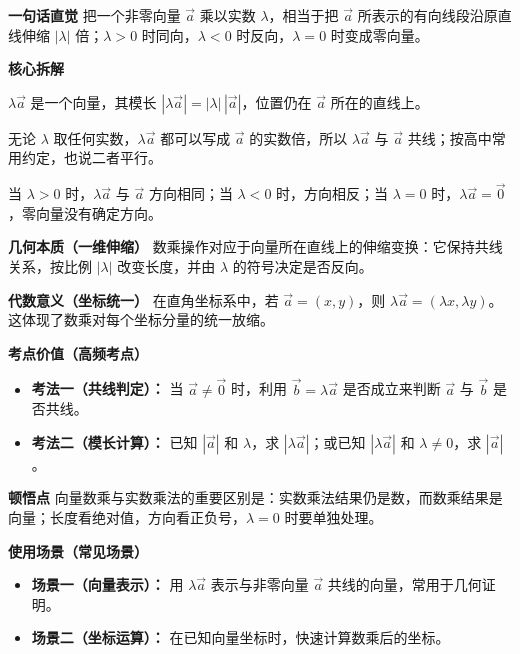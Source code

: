 \begin{explanationbox}
	\textbf{\textcolor{CExplanation}{一句话直觉}}
	把一个非零向量 $\vec{a}$ 乘以实数 $\lambda$，相当于把 $\vec{a}$ 所表示的有向线段沿原直线伸缩 $|\lambda|$ 倍；$\lambda>0$ 时同向，$\lambda<0$ 时反向，$\lambda=0$ 时变成零向量。

	\medskip
	\textbf{\textcolor{CExplanation}{核心拆解}}
	\begin{description}[style=nextline, leftmargin=2.8em, labelsep=0.5em, itemsep=0.45em]
		\item[\textbf{要点一（数乘定义）：}]
			$\lambda\vec{a}$ 是一个向量，其模长 $|\lambda\vec{a}| = |\lambda|\,|\vec{a}|$，位置仍在 $\vec{a}$ 所在的直线上。
		\item[\textbf{要点二（共线恒成立）：}]
			无论 $\lambda$ 取任何实数，$\lambda\vec{a}$ 都可以写成 $\vec{a}$ 的实数倍，所以 $\lambda\vec{a}$ 与 $\vec{a}$ 共线；按高中常用约定，也说二者平行。
		\item[\textbf{要点三（符号判方向）：}]
			当 $\lambda > 0$ 时，$\lambda\vec{a}$ 与 $\vec{a}$ 方向相同；当 $\lambda < 0$ 时，方向相反；当 $\lambda=0$ 时，$\lambda\vec{a}=\vec{0}$，零向量没有确定方向。
	\end{description}

	\medskip
	\textbf{\textcolor{CExplanation}{几何本质（一维伸缩）}}
	数乘操作对应于向量所在直线上的伸缩变换：它保持共线关系，按比例 $|\lambda|$ 改变长度，并由 $\lambda$ 的符号决定是否反向。

	\medskip
	\textbf{\textcolor{CExplanation}{代数意义（坐标统一）}}
	在直角坐标系中，若 $\vec{a}=(x,y)$，则 $\lambda\vec{a}=(\lambda x,\lambda y)$。这体现了数乘对每个坐标分量的统一放缩。

	\medskip
	\textbf{\textcolor{CExplanation}{考点价值（高频考点）}}
	\begin{itemize}[leftmargin=*, itemsep=0.5em, topsep=0.4em]
		\item \textbf{考法一（共线判定）：} 当 $\vec{a}\neq\vec{0}$ 时，利用 $\vec{b}=\lambda\vec{a}$ 是否成立来判断 $\vec{a}$ 与 $\vec{b}$ 是否共线。
		\item \textbf{考法二（模长计算）：} 已知 $|\vec{a}|$ 和 $\lambda$，求 $|\lambda\vec{a}|$；或已知 $|\lambda\vec{a}|$ 和 $\lambda\neq0$，求 $|\vec{a}|$。
	\end{itemize}

	\medskip
	\textbf{\textcolor{CExplanation}{顿悟点}}
	向量数乘与实数乘法的重要区别是：实数乘法结果仍是数，而数乘结果是向量；长度看绝对值，方向看正负号，$\lambda=0$ 时要单独处理。

	\medskip
	\textbf{\textcolor{CExplanation}{使用场景（常见场景）}}
	\begin{itemize}[leftmargin=*, itemsep=0.5em, topsep=0.4em]
		\item \textbf{场景一（向量表示）：} 用 $\lambda\vec{a}$ 表示与非零向量 $\vec{a}$ 共线的向量，常用于几何证明。
		\item \textbf{场景二（坐标运算）：} 在已知向量坐标时，快速计算数乘后的坐标。
	\end{itemize}
\end{explanationbox}